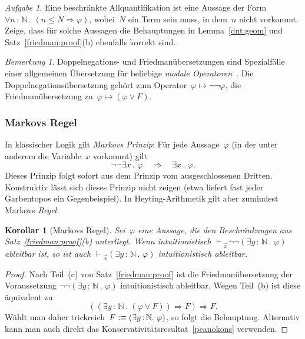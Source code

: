 \documentclass[a4paper,ngerman,12pt]{scrartcl}
\theoremstyle{definition}
\theoremstyle{plain}
\newtheorem{kor}[defn]{Korollar}
\theoremstyle{remark}
\newtheorem{bem}[defn]{Bemerkung}
\newtheorem{aufg}[defn]{Aufgabe}
\newcommand{\NN}{\mathbb{N}}
\newcommand{\seq}[1]{\mathrel{\vdash\!\!\!_{#1}}}
\renewcommand{\_}{\mathpunct{.}\,}
\newcommand{\?}{\,{:}\,}
\newcommand{\defequiv}{\vcentcolon\equiv}
\begin{document}
\begin{aufg}\label{aufg-beschr-allquant}Eine beschränkte Allquantifikation ist
eine Aussage der Form~$\forall n\?\NN\_ (n \leq N \Rightarrow \varphi)$,
wobei~$N$ ein Term sein muss, in dem~$n$ nicht vorkommt. Zeige,
dass für solche Aussagen die Behauptungen in Lemma~\ref{dnt:geom} und
Satz~\ref{friedman:proof}(b) ebenfalls korrekt sind.\end{aufg}

\begin{bem}Doppelnegations- und Friedmanübersetzungen sind Spezialfälle einer
allgemeinen Übersetzung für beliebige \emph{modale
Operatoren}~\cite{aczel:russell-prawitz,escardo:oliva:peirce-shift}.
Die Doppelnegationsübersetzung gehört zum Operator~$\varphi \mapsto
\neg\neg\varphi$, die Friedmanübersetzung zu~$\varphi \mapsto (\varphi \vee
F)$.\end{bem}


\subsubsection*{Markovs Regel}

In klassischer Logik gilt \emph{Markovs Prinzip}: Für jede Aussage~$\varphi$
(in der unter anderem die Variable~$x$ vorkommt) gilt
\[ \neg\neg \exists x\_ \varphi \quad\Longrightarrow\quad
  \exists x\_ \varphi. \]
Dieses Prinzip folgt sofort aus dem Prinzip vom ausgeschlossenen Dritten.
Konstruktiv lässt sich dieses Prinzip nicht zeigen (etwa liefert fast jeder
Garbentopos ein Gegenbeispiel). In Heyting-Arithmetik gilt aber zumindest
Markovs \emph{Regel}:

\begin{kor}[Markovs Regel]Sei~$\varphi$ eine Aussage, die den Beschränkungen
aus Satz~\ref{friedman:proof}(b) unterliegt. Wenn intuitionistisch
$\seq{\vec x} \neg\neg(\exists y\?\NN\_ \varphi)$
ableitbar ist, so ist auch
$\seq{\vec x} (\exists y\?\NN\_ \varphi)$
intuitionistisch ableitbar.\end{kor}
\begin{proof}Nach Teil~(c) von Satz~\ref{friedman:proof} ist die
Friedmanübersetzung der Voraussetzung $\neg\neg(\exists
y\?\NN\_ \varphi)$ intuitionistisch ableitbar. Wegen Teil~(b) ist diese äquivalent zu
\[ ((\exists y\?\NN\_ (\varphi \vee F)) \Rightarrow F) \Rightarrow F. \]
Wählt man daher trickreich~$F \defequiv (\exists y\?\NN\_ \varphi)$, so folgt die Behauptung.
Alternativ kann man auch direkt das Konservativitätsresultat~\ref{peanokons}
verwenden.
\end{proof}
\end{document}
